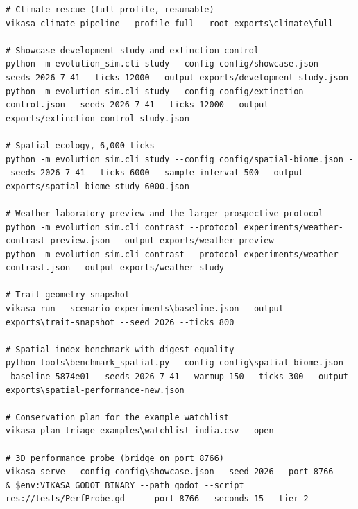 \begin{lstlisting}
# Climate rescue (full profile, resumable)
vikasa climate pipeline --profile full --root exports\climate\full

# Showcase development study and extinction control
python -m evolution_sim.cli study --config config/showcase.json --seeds 2026 7 41 --ticks 12000 --output exports/development-study.json
python -m evolution_sim.cli study --config config/extinction-control.json --seeds 2026 7 41 --ticks 12000 --output exports/extinction-control-study.json

# Spatial ecology, 6,000 ticks
python -m evolution_sim.cli study --config config/spatial-biome.json --seeds 2026 7 41 --ticks 6000 --sample-interval 500 --output exports/spatial-biome-study-6000.json

# Weather laboratory preview and the larger prospective protocol
python -m evolution_sim.cli contrast --protocol experiments/weather-contrast-preview.json --output exports/weather-preview
python -m evolution_sim.cli contrast --protocol experiments/weather-contrast.json --output exports/weather-study

# Trait geometry snapshot
vikasa run --scenario experiments\baseline.json --output exports\trait-snapshot --seed 2026 --ticks 800

# Spatial-index benchmark with digest equality
python tools\benchmark_spatial.py --config config\spatial-biome.json --baseline 5874e01 --seeds 2026 7 41 --warmup 150 --ticks 300 --output exports\spatial-performance-new.json

# Conservation plan for the example watchlist
vikasa plan triage examples\watchlist-india.csv --open

# 3D performance probe (bridge on port 8766)
vikasa serve --config config\showcase.json --seed 2026 --port 8766
& $env:VIKASA_GODOT_BINARY --path godot --script res://tests/PerfProbe.gd -- --port 8766 --seconds 15 --tier 2
\end{lstlisting}

